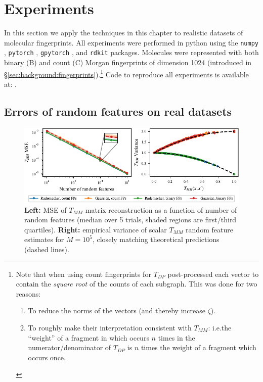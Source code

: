 \section{Experiments}\label{sec:trf:experiments}

In this section we apply the techniques in this chapter to realistic datasets of molecular fingerprints.
All experiments were performed in python using the
\texttt{numpy} \citep{harris2020array},
\texttt{pytorch} \citep{paszke2019pytorch},
\texttt{gpytorch} \citep{gardner2018gpytorch},
and \texttt{rdkit} \citep{rdkit-version-2023-09-01} packages.
Molecules were represented with both binary (B) and count (C) Morgan fingerprints
of dimension 1024 (introduced in \S\ref{sec:background:fingerprints}).\footnote{
    Note that when using count fingerprints for $T_{DP}$ post-processed each vector to contain
    the \emph{square root} of the counts of each subgraph.
    This was done for two reasons:
    \begin{enumerate}
        \item To reduce the norms of the vectors (and thereby increase $\zeta$).
        \item To roughly make their interpretation consistent with $T_{MM}$: i.e.\@ the ``weight'' of a fragment in which occurs $n$ times in the numerator/denominator of $T_{DP}$ is $n$ times the weight of a fragment which occurs once.
    \end{enumerate}
}
Code to reproduce all experiments is available at: \TRFcodeURL{}.

\subsection{Errors of random features on real datasets}\label{sec:expt-rf-on-real-data}

\begin{figure}
    \centering
    \includegraphics{chapter0x-TRF/new-figures/tmm_variance.pdf}
    \caption[Errors of TMM random features on real data]{
    \textbf{Left:} MSE of $T_{MM}$ matrix reconstruction as a function of number of random features (median over 5 trials, shaded regions are first/third quartiles).
    \textbf{Right:} empirical variance of scalar $T_{MM}$ random feature estimates for $M=10^5$,
    closely matching theoretical predictions (dashed lines).
    }
    \label{fig:tmm-rfs}
\end{figure}

